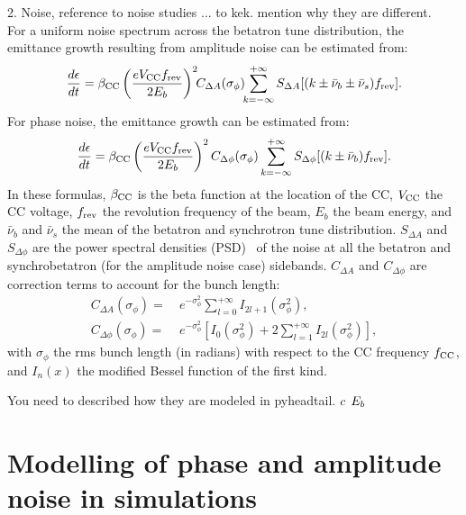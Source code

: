 2. Noise, reference to noise studies ... to kek. mention why they are different.\\


For a uniform noise spectrum across the betatron tune distribution, the emittance growth resulting from amplitude noise can be estimated from:
\begin{equation}\label{eq:dey_an}
    \frac{d\epsilon}{dt}  = {\beta_\mathrm{CC}} \left( \frac{e{V_\mathrm{CC}}{f_\mathrm{rev}}}{2E_b}\right)^2 \!\! C_{\Delta A} (\sigma_{\phi}) \!\! \sum_{k=-\infty}^{+\infty} S_{\Delta A}[(k \pm \bar{\nu}_b \pm \bar{\nu}_s){f_\mathrm{rev}}].
\end{equation}
For phase noise, the emittance growth can be estimated from:
\begin{equation}\label{eq:dey_pn}
    \frac{d\epsilon}{dt}  = {\beta_\mathrm{CC}} \left( \frac{e{V_\mathrm{CC}}{f_\mathrm{rev}}}{2E_b}\right)^2 C_{\Delta \phi} (\sigma_{\phi}) \sum_{k=-\infty}^{+\infty} S_{\Delta \phi}[(k \pm \bar{\nu}_b){f_\mathrm{rev}}].
\end{equation}
 In these formulas, ${\beta_\mathrm{CC}}$ is the beta function at the location of the CC, ${V_\mathrm{CC}}$ the CC voltage, ${f_\mathrm{rev}}$ the revolution frequency of the beam, $E_b$ the beam energy, and $\bar{\nu}_b$ and $\bar{\nu}_s$ the mean of the betatron and synchrotron tune distribution. $S_{\Delta A}$ and $S_{\Delta \phi}$ are the power spectral densities (PSD)~\cite{b_papoulis1991probability} of the noise at all the betatron and synchrobetatron (for the amplitude noise case) sidebands. %
 $C_{\Delta A}$ and $C_{\Delta \phi}$ are correction terms to account for the bunch length:
\begin{align}
C_{\Delta A}(\sigma_{\phi}) = ~& e^{-\sigma_{\phi}^2}\sum_{l=0}^{+\infty} I_{2l+1}(\sigma_{\phi}^2),\\
C_{\Delta \phi}(\sigma_{\phi}) = ~& e^{-\sigma_{\phi}^2} \left[I_0(\sigma_{\phi}^2) + 2 \sum_{l=1}^{+\infty} I_{2l}(\sigma_{\phi}^2) \right],
\end{align}
with $\sigma_{\phi}$ the rms bunch length (in radians) with respect to the CC frequency ${f_\mathrm{CC}}$, and $I_n(x)$ the modified Bessel function of the first kind. 


You need to described how they are modeled in pyheadtail.
${c}$
${E_b}$


\section{Modelling of phase and amplitude noise in simulations}

